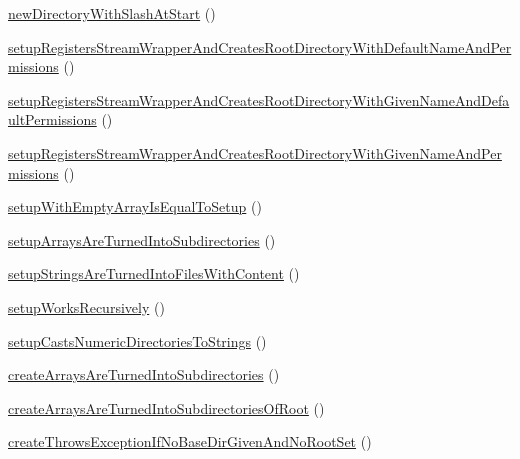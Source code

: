 \begin{DoxyCompactItemize}
\item 
\mbox{\hyperlink{classorg_1_1bovigo_1_1vfs_1_1vfs_stream_test_case_af4722fc38cf6f25dbdc2721ff970c7f6}{new\+Directory\+With\+Slash\+At\+Start}} ()
\item 
\mbox{\hyperlink{classorg_1_1bovigo_1_1vfs_1_1vfs_stream_test_case_a8e164c9368f8e391b58171c856fde173}{setup\+Registers\+Stream\+Wrapper\+And\+Creates\+Root\+Directory\+With\+Default\+Name\+And\+Permissions}} ()
\item 
\mbox{\hyperlink{classorg_1_1bovigo_1_1vfs_1_1vfs_stream_test_case_a7d5873f5fb6a877557bdadc78967c537}{setup\+Registers\+Stream\+Wrapper\+And\+Creates\+Root\+Directory\+With\+Given\+Name\+And\+Default\+Permissions}} ()
\item 
\mbox{\hyperlink{classorg_1_1bovigo_1_1vfs_1_1vfs_stream_test_case_ad61917c375fae467a3d3fdb16edbeace}{setup\+Registers\+Stream\+Wrapper\+And\+Creates\+Root\+Directory\+With\+Given\+Name\+And\+Permissions}} ()
\item 
\mbox{\hyperlink{classorg_1_1bovigo_1_1vfs_1_1vfs_stream_test_case_a208f2767c9391e6d574c3401c7fd9968}{setup\+With\+Empty\+Array\+Is\+Equal\+To\+Setup}} ()
\item 
\mbox{\hyperlink{classorg_1_1bovigo_1_1vfs_1_1vfs_stream_test_case_a525f1334f1241005c253f58ee441c901}{setup\+Arrays\+Are\+Turned\+Into\+Subdirectories}} ()
\item 
\mbox{\hyperlink{classorg_1_1bovigo_1_1vfs_1_1vfs_stream_test_case_aea51bb4ac801a78ab9ffcce3267e9e38}{setup\+Strings\+Are\+Turned\+Into\+Files\+With\+Content}} ()
\item 
\mbox{\hyperlink{classorg_1_1bovigo_1_1vfs_1_1vfs_stream_test_case_ac44031783b50823bfbbf69b87be6e7d6}{setup\+Works\+Recursively}} ()
\item 
\mbox{\hyperlink{classorg_1_1bovigo_1_1vfs_1_1vfs_stream_test_case_a6f45f339dcb87e75700edad1743c0948}{setup\+Casts\+Numeric\+Directories\+To\+Strings}} ()
\item 
\mbox{\hyperlink{classorg_1_1bovigo_1_1vfs_1_1vfs_stream_test_case_af82c08f20d3a551ca3ce08699813e8d5}{create\+Arrays\+Are\+Turned\+Into\+Subdirectories}} ()
\item 
\mbox{\hyperlink{classorg_1_1bovigo_1_1vfs_1_1vfs_stream_test_case_a58d40442b1a3870abcbad994d8a300bc}{create\+Arrays\+Are\+Turned\+Into\+Subdirectories\+Of\+Root}} ()
\item 
\mbox{\hyperlink{classorg_1_1bovigo_1_1vfs_1_1vfs_stream_test_case_a626fd7f4d53ef3f8a8fe364d119e4d4e}{create\+Throws\+Exception\+If\+No\+Base\+Dir\+Given\+And\+No\+Root\+Set}} ()

\end{DoxyCompactItemize}
